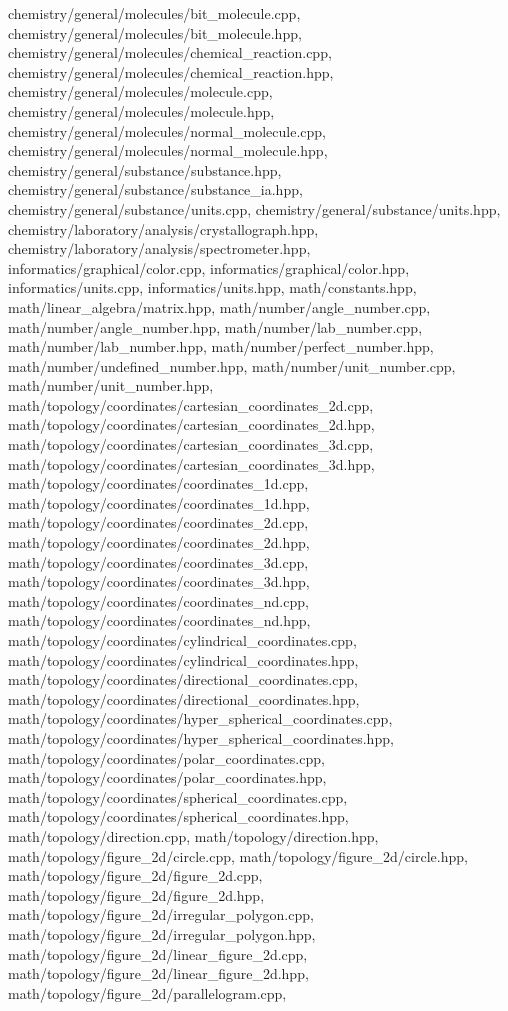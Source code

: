 \begin{DoxyVerb}
chemistry/general/molecules/bit_molecule.cpp,
chemistry/general/molecules/bit_molecule.hpp,
chemistry/general/molecules/chemical_reaction.cpp,
chemistry/general/molecules/chemical_reaction.hpp,
chemistry/general/molecules/molecule.cpp,
chemistry/general/molecules/molecule.hpp,
chemistry/general/molecules/normal_molecule.cpp,
chemistry/general/molecules/normal_molecule.hpp,
chemistry/general/substance/substance.hpp,
chemistry/general/substance/substance_ia.hpp,
chemistry/general/substance/units.cpp,
chemistry/general/substance/units.hpp,
chemistry/laboratory/analysis/crystallograph.hpp,
chemistry/laboratory/analysis/spectrometer.hpp,
informatics/graphical/color.cpp, informatics/graphical/color.hpp,
informatics/units.cpp, informatics/units.hpp, math/constants.hpp,
math/linear_algebra/matrix.hpp, math/number/angle_number.cpp,
math/number/angle_number.hpp, math/number/lab_number.cpp,
math/number/lab_number.hpp, math/number/perfect_number.hpp,
math/number/undefined_number.hpp, math/number/unit_number.cpp,
math/number/unit_number.hpp,
math/topology/coordinates/cartesian_coordinates_2d.cpp,
math/topology/coordinates/cartesian_coordinates_2d.hpp,
math/topology/coordinates/cartesian_coordinates_3d.cpp,
math/topology/coordinates/cartesian_coordinates_3d.hpp,
math/topology/coordinates/coordinates_1d.cpp,
math/topology/coordinates/coordinates_1d.hpp,
math/topology/coordinates/coordinates_2d.cpp,
math/topology/coordinates/coordinates_2d.hpp,
math/topology/coordinates/coordinates_3d.cpp,
math/topology/coordinates/coordinates_3d.hpp,
math/topology/coordinates/coordinates_nd.cpp,
math/topology/coordinates/coordinates_nd.hpp,
math/topology/coordinates/cylindrical_coordinates.cpp,
math/topology/coordinates/cylindrical_coordinates.hpp,
math/topology/coordinates/directional_coordinates.cpp,
math/topology/coordinates/directional_coordinates.hpp,
math/topology/coordinates/hyper_spherical_coordinates.cpp,
math/topology/coordinates/hyper_spherical_coordinates.hpp,
math/topology/coordinates/polar_coordinates.cpp,
math/topology/coordinates/polar_coordinates.hpp,
math/topology/coordinates/spherical_coordinates.cpp,
math/topology/coordinates/spherical_coordinates.hpp,
math/topology/direction.cpp, math/topology/direction.hpp,
math/topology/figure_2d/circle.cpp,
math/topology/figure_2d/circle.hpp,
math/topology/figure_2d/figure_2d.cpp,
math/topology/figure_2d/figure_2d.hpp,
math/topology/figure_2d/irregular_polygon.cpp,
math/topology/figure_2d/irregular_polygon.hpp,
math/topology/figure_2d/linear_figure_2d.cpp,
math/topology/figure_2d/linear_figure_2d.hpp,
math/topology/figure_2d/parallelogram.cpp,

\end{DoxyVerb}
